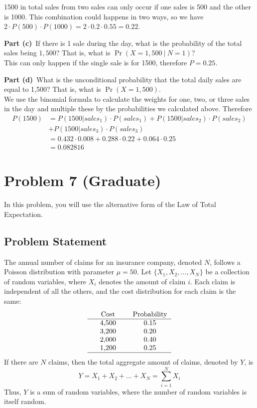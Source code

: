 \documentclass[12pt]{article}
\theoremstyle{definition}
\begin{document}
1500 in total sales from two sales can only occur if one sales is 500 and the other is 1000. This combination could happens in two ways, so we have $2\cdot P(500)\cdot P(1000) = 2\cdot 0.2 \cdot 0.55 = 0.22$.

\newpage
\noindent
{\bf Part (c)}\ If there is 1 sale during the day, what is the probability of the total sales being $1,500$? That is, what is $\Pr(X = 1,500\ |\ N = 1)$?\\

This can only happen if the single sale is for 1500, therefore $P = 0.25$.


\vspace{3in}
\noindent
{\bf Part (d)}\ What is the unconditional probability that the total daily sales are equal to 1,500? That is, what is $\Pr(X = 1,500)$.\\

We use the binomial formula to calculate the weights for one, two, or three sales in the day and multiple these by the probabilities we calculated above. Therefore
\begin{align*}
P(1500) &= P(1500|sales_1)\cdot P(sales_1) + P(1500|sales_2)\cdot P(sales_2)\\
&+ P(1500|sales_3)\cdot P(sales_3)\\
&= 0.432 \cdot 0.008 + 0.288 \cdot 0.22 + 0.064 \cdot 0.25\\
&= 0.082816
\end{align*}

\newpage
\section*{Problem 7 (Graduate)}

In this problem, you will use the alternative form of the Law of Total Expectation.

\subsection*{Problem Statement}

The annual number of claims for an insurance company, denoted $N$, follows a Poisson distribution with parameter $\mu = 50$. Let $\{X_1, X_2, \ldots, X_N\}$ be a collection of random variables, where $X_i$ denotes the amount of claim $i$. Each claim is independent of all the others, and the cost distribution for each claim is the same:
$$
\begin{tabular}{ccccc}
& Cost & & Probability\\
\hline
& 4,500 & & 0.15\\
& 3,200 & & 0.20\\
& 2,000 & & 0.40\\
& 1,200 & & 0.25\\
\hline
\end{tabular}
$$
If there are $N$ claims, then the total aggregate amount of claims, denoted by $Y$, is
$$
Y = X_1 + X_2 + \ldots + X_N = \sum_{i=1}^N X_i
$$
Thus, $Y$ is a sum of random variables, where the number of random variables is itself random.
\end{document}
